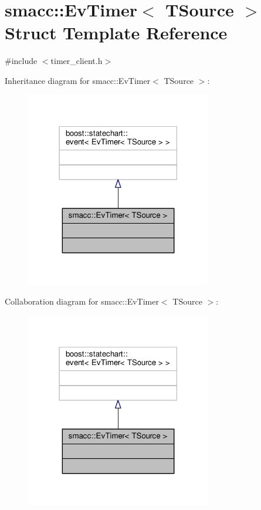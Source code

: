 \hypertarget{structsmacc_1_1EvTimer}{}\section{smacc\+:\+:Ev\+Timer$<$ T\+Source $>$ Struct Template Reference}
\label{structsmacc_1_1EvTimer}


{\ttfamily \#include $<$timer\+\_\+client.\+h$>$}



Inheritance diagram for smacc\+:\+:Ev\+Timer$<$ T\+Source $>$\+:
\nopagebreak
\begin{figure}[H]
\begin{center}
\leavevmode
\includegraphics[width=230pt]{structsmacc_1_1EvTimer__inherit__graph}
\end{center}
\end{figure}


Collaboration diagram for smacc\+:\+:Ev\+Timer$<$ T\+Source $>$\+:
\nopagebreak
\begin{figure}[H]
\begin{center}
\leavevmode
\includegraphics[width=230pt]{structsmacc_1_1EvTimer__coll__graph}
\end{center}
\end{figure}


